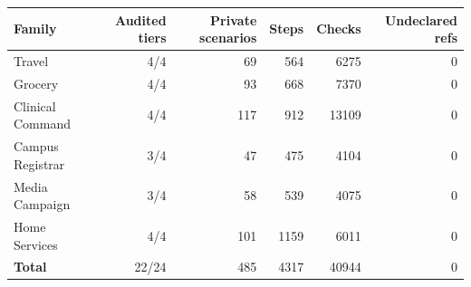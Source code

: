 \begin{tabular}{lrrrrr}
\toprule
Family & Audited tiers & Private scenarios & Steps & Checks & Undeclared refs \\
\midrule
Travel & 4/4 & 69 & 564 & 6275 & 0 \\
Grocery & 4/4 & 93 & 668 & 7370 & 0 \\
Clinical Command & 4/4 & 117 & 912 & 13109 & 0 \\
Campus Registrar & 3/4 & 47 & 475 & 4104 & 0 \\
Media Campaign & 3/4 & 58 & 539 & 4075 & 0 \\
Home Services & 4/4 & 101 & 1159 & 6011 & 0 \\
\midrule
\textbf{Total} & 22/24 & 485 & 4317 & 40944 & 0 \\
\bottomrule
\end{tabular}
